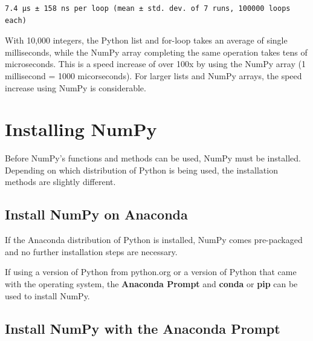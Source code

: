 \documentclass{book}
\begin{document}
    \begin{Verbatim}[commandchars=\\\{\}]
7.4 µs ± 158 ns per loop (mean ± std. dev. of 7 runs, 100000 loops each)

    \end{Verbatim}


    
        With 10,000 integers, the Python list and for-loop takes an average of
single milliseconds, while the NumPy array completing the same operation
takes tens of microseconds. This is a speed increase of over 100x by
using the NumPy array (1 millisecond = 1000 micorseconds). For larger
lists and NumPy arrays, the speed increase using NumPy is considerable.
    




    
        \section{Installing NumPy}\label{installing-numpy}
    




    
        Before NumPy's functions and methods can be used, NumPy must be
installed. Depending on which distribution of Python is being used, the
installation methods are slightly different.
    




    
        \subsection{Install NumPy on Anaconda}\label{install-numpy-on-anaconda}

If the Anaconda distribution of Python is installed, NumPy comes
pre-packaged and no further installation steps are necessary.

If using a version of Python from python.org or a version of Python that
came with the operating system, the \textbf{Anaconda Prompt} and
\textbf{conda} or \textbf{pip} can be used to install NumPy.
    




    
        \subsection{Install NumPy with the Anaconda
Prompt}\label{install-numpy-with-the-anaconda-prompt}
\end{document}
